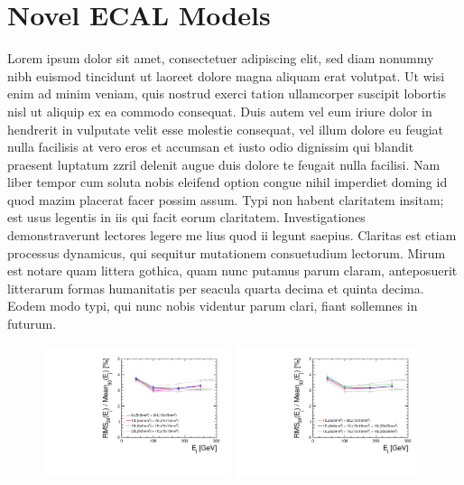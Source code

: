 \documentclass[final,3p,times,twocolumn]{elsarticle}
\begin{document}
\section{Novel ECAL Models}
Lorem ipsum dolor sit amet, consectetuer adipiscing elit, sed diam nonummy nibh euismod tincidunt ut laoreet dolore magna aliquam erat volutpat. Ut wisi enim ad minim veniam, quis
nostrud exerci tation ullamcorper suscipit lobortis nisl ut aliquip ex ea commodo consequat. Duis autem vel eum iriure dolor in hendrerit in vulputate velit esse molestie consequat,
vel illum dolore eu feugiat nulla facilisis at vero eros et accumsan et iusto odio dignissim qui blandit praesent luptatum zzril delenit augue duis dolore te feugait nulla facilisi.
Nam liber tempor cum soluta nobis eleifend option congue nihil imperdiet doming id quod mazim placerat facer possim assum. Typi non habent claritatem insitam; est usus legentis in
iis qui facit eorum claritatem. Investigationes demonstraverunt lectores legere me lius quod ii legunt saepius. Claritas est etiam processus dynamicus, qui sequitur mutationem
consuetudium lectorum. Mirum est notare quam littera gothica, quam nunc putamus parum claram, anteposuerit litterarum formas humanitatis per seacula quarta decima et quinta
decima. Eodem modo typi, qui nunc nobis videntur parum clari, fiant sollemnes in futurum.

\begin{figure}[!h]
  \begin{center}
     \includegraphics[width=0.49\textwidth]{TwoG_Context_15mm.pdf}
     \includegraphics[width=0.49\textwidth]{ThreeG_Context_15mm.pdf}
     \caption{\label{}}
  \end{center}
\end{figure}
\end{document}
